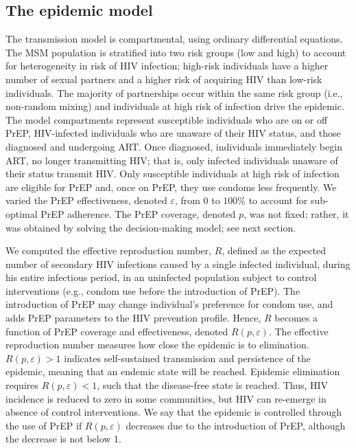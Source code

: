 \documentclass[preprint,review,12pt]{article}			%
\begin{document}
\subsection{The epidemic model} \label{subsec:MathModel}

The transmission model is compartmental, using ordinary differential equations. The MSM population is stratified into two risk groups (low and high) to account for heterogeneity in risk of HIV infection;\cite{Jacquez1989} high-risk individuals have a higher number of sexual partners and a higher risk of acquiring HIV than low-risk individuals. The majority of partnerships occur within the same risk group (i.e., non-random mixing)\cite{Jacquez1988} and individuals at high risk of infection drive the epidemic.\cite{Lions2019} The model compartments represent susceptible individuals who are on or off PrEP, HIV-infected individuals who are unaware of their HIV status, and those diagnosed and undergoing ART. Once diagnosed, individuals immediately begin ART, no longer transmitting HIV; that is, only infected individuals unaware of their status transmit HIV. Only susceptible individuals at high risk of infection are eligible for PrEP and, once on PrEP, they use condoms less frequently.\cite{Molina2018} We varied the PrEP effectiveness, denoted $\varepsilon$, from $0$ to $100\%$ to account for sub-optimal PrEP adherence. The PrEP coverage, denoted $p$, was not fixed; rather, it was obtained by solving the decision-making model; see next section.

We computed the effective reproduction number, $R$, defined as the expected number of secondary HIV infections caused by a single infected individual, during his entire infectious period, in an uninfected population subject to control interventions (e.g., condom use before the introduction of PrEP).\cite{Jacquez1988,VandenDriessche2002} The introduction of PrEP may change individual's preference for condom use, and adds PrEP parameters to the HIV prevention profile. Hence, $R$ becomes a function of PrEP coverage and effectiveness, denoted $R(p,\varepsilon)$. The effective reproduction number measures how close the epidemic is to elimination. $R(p,\varepsilon)>1$ indicates self-sustained transmission and persistence of the epidemic, meaning that an endemic state will be reached. Epidemic elimination requires $R(p,\varepsilon)<1$, such that the disease-free state is reached. Thus, HIV incidence is reduced to zero in some communities, but HIV can re-emerge in absence of control interventions. We say that the epidemic is controlled through the use of PrEP if $R(p,\varepsilon)$ decreases due to the introduction of PrEP, although the decrease is not below 1.
\end{document}
